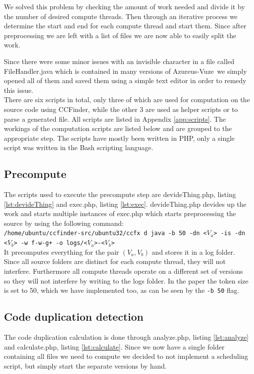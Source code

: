 \documentclass[a4paper,twoside,11pt]{article}
\newcommand{\av}{{\sc Azureus-Vuze}~}
\begin{document}
We solved this problem by checking the amount of work needed and divide it by the number of desired compute threads. Then through an iterative process we determine the start and end for each compute thread and start them. Since after preprocessing we are left with a list of files we are now able to easily split the work. 

Since there were some minor issues with an invisible character in a file called {\sc FileHandler.java} which is contained in many versions of \av we simply opened all of them and saved them using a simple text editor in order to remedy this issue. \\

There are six scripts in total, only three of which are used for computation on the source code using {\sc CCFinder}, while the other 3 are used as helper scripts or to parse a generated file. All scripts are listed in Appendix \ref{app:scripts}. The workings of the computation scripts are listed below and are grouped to the appropriate step. The scripts have mostly been written in {\sc PHP}\cite{url:php}, only a single script was written in the Bash\cite{url:bash} scripting language. \\

\subsection{Precompute}
The scripts used to execute the precompute step are {\sc devideThing.php}, listing \ref{lst:devideThing} and {\sc exec.php}, listing \ref{lst:exec}. {\sc devideThing.php} devides up the work and starts multiple instances of {\sc exec.php} which starts preprocessing the source by using the following command: \\

\noindent\texttt{/home/ubuntu/ccfinder-src/ubuntu32/ccfx d java -b 50 -dn <$V_a$> -is -dn <$V_b$> -w f-w-g+ -o logs/<$V_a$>-<$V_b$>} \\

It precomputes everything for the pair $(V_a,V_b)$ and stores it in a log folder. Since all source folders are distinct for each compute thread, they will not interfere. Furthermore all compute threads operate on a different set of versions so they will not interfere by writing to the logs folder. In the paper the token size is set to 50, which we have implemented too, as can be seen by the \texttt{-b 50} flag.

\subsection{Code duplication detection}
The code duplication calculation is done through {\sc analyze.php}, listing \ref{lst:analyze} and {\sc calculate.php}, listing \ref{lst:calculate}. Since we now have a single folder containing all files we need to compute we decided to not implement a scheduling script, but simply start the separate versions by hand. \\
\end{document}
